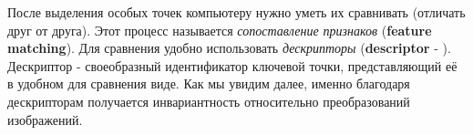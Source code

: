 После выделения особых точек компьютеру нужно уметь их сравнивать (отличать друг от друга). Этот процесс называется \textit{сопоставление признаков} (\textbf{feature matching}). Для сравнения удобно использовать \textit{дескрипторы} (\textbf{descriptor} - ). Дескриптор - своеобразный идентификатор ключевой точки, представляющий её в удобном для сравнения виде. Как мы увидим далее, именно благодаря дескрипторам получается инвариантность относительно преобразований изображений.
